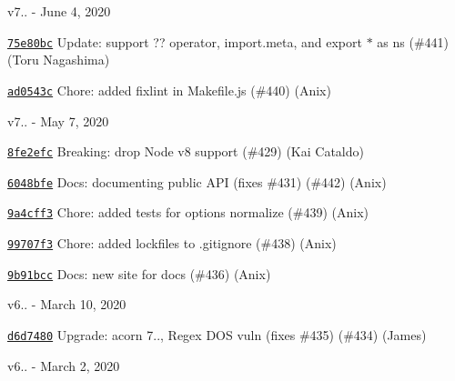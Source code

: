 v7.. -\/ June 4, 2020


\begin{DoxyItemize}
\item \href{https://github.com/eslint/espree/commit/75e80bc1b5a100f64b09b2c7bf47c5168417d890}{\texttt{ {\ttfamily 75e80bc}}} Update\+: support {\ttfamily ??} operator, {\ttfamily import.\+meta}, and {\ttfamily export \texorpdfstring{$\ast$}{*} as ns} (\#441) (Toru Nagashima)
\item \href{https://github.com/eslint/espree/commit/ad0543c8b9f6981857ebebf23a37589a656e61a6}{\texttt{ {\ttfamily ad0543c}}} Chore\+: added fixlint in Makefile.\+js (\#440) (Anix)
\end{DoxyItemize}

v7.. -\/ May 7, 2020


\begin{DoxyItemize}
\item \href{https://github.com/eslint/espree/commit/8fe2efc00902e7f1680af00a6279e1aecb3c5b47}{\texttt{ {\ttfamily 8fe2efc}}} Breaking\+: drop Node v8 support (\#429) (Kai Cataldo)
\item \href{https://github.com/eslint/espree/commit/6048bfe3939fa7dc162c0b3c4b043bb410736b0b}{\texttt{ {\ttfamily 6048bfe}}} Docs\+: documenting public API (fixes \#431) (\#442) (Anix)
\item \href{https://github.com/eslint/espree/commit/9a4cff3626d50a88428ca1b66610a2bdedd774dd}{\texttt{ {\ttfamily 9a4cff3}}} Chore\+: added tests for options normalize (\#439) (Anix)
\item \href{https://github.com/eslint/espree/commit/99707f3f9d337ca719dce5720106f98b65bba7b1}{\texttt{ {\ttfamily 99707f3}}} Chore\+: added lockfiles to .gitignore (\#438) (Anix)
\item \href{https://github.com/eslint/espree/commit/9b91bccacea15c75025a62bae828f83598aef5fe}{\texttt{ {\ttfamily 9b91bcc}}} Docs\+: new site for docs (\#436) (Anix)
\end{DoxyItemize}

v6.. -\/ March 10, 2020


\begin{DoxyItemize}
\item \href{https://github.com/eslint/espree/commit/d6d7480e424960159007caea86f209f696138734}{\texttt{ {\ttfamily d6d7480}}} Upgrade\+: acorn 7.., Regex DOS vuln (fixes \#435) (\#434) (James)
\end{DoxyItemize}

v6.. -\/ March 2, 2020


